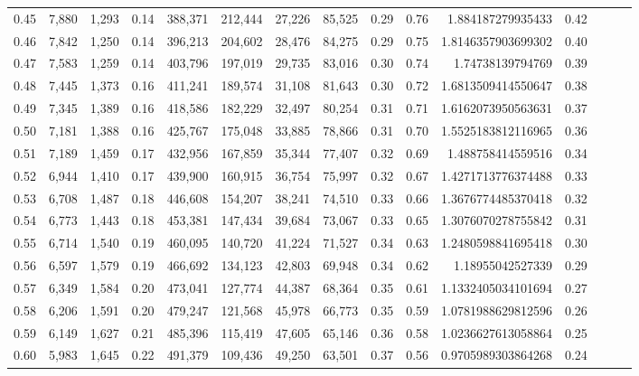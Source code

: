 \begin{tabular}{rrrrrrrrrrrrrrr}
0.45 &  7,880 &  1,293 &  0.14 &  388,371 &  212,444 &   27,226 &   85,525 &  0.29 &  0.76 &       1.884187279935433 &      0.42 \\
0.46 &  7,842 &  1,250 &  0.14 &  396,213 &  204,602 &   28,476 &   84,275 &  0.29 &  0.75 &      1.8146357903699302 &      0.40 \\
0.47 &  7,583 &  1,259 &  0.14 &  403,796 &  197,019 &   29,735 &   83,016 &  0.30 &  0.74 &        1.74738139794769 &      0.39 \\
0.48 &  7,445 &  1,373 &  0.16 &  411,241 &  189,574 &   31,108 &   81,643 &  0.30 &  0.72 &      1.6813509414550647 &      0.38 \\
0.49 &  7,345 &  1,389 &  0.16 &  418,586 &  182,229 &   32,497 &   80,254 &  0.31 &  0.71 &      1.6162073950563631 &      0.37 \\
0.50 &  7,181 &  1,388 &  0.16 &  425,767 &  175,048 &   33,885 &   78,866 &  0.31 &  0.70 &      1.5525183812116965 &      0.36 \\
0.51 &  7,189 &  1,459 &  0.17 &  432,956 &  167,859 &   35,344 &   77,407 &  0.32 &  0.69 &       1.488758414559516 &      0.34 \\
0.52 &  6,944 &  1,410 &  0.17 &  439,900 &  160,915 &   36,754 &   75,997 &  0.32 &  0.67 &      1.4271713776374488 &      0.33 \\
0.53 &  6,708 &  1,487 &  0.18 &  446,608 &  154,207 &   38,241 &   74,510 &  0.33 &  0.66 &      1.3676774485370418 &      0.32 \\
0.54 &  6,773 &  1,443 &  0.18 &  453,381 &  147,434 &   39,684 &   73,067 &  0.33 &  0.65 &      1.3076070278755842 &      0.31 \\
0.55 &  6,714 &  1,540 &  0.19 &  460,095 &  140,720 &   41,224 &   71,527 &  0.34 &  0.63 &      1.2480598841695418 &      0.30 \\
0.56 &  6,597 &  1,579 &  0.19 &  466,692 &  134,123 &   42,803 &   69,948 &  0.34 &  0.62 &        1.18955042527339 &      0.29 \\
0.57 &  6,349 &  1,584 &  0.20 &  473,041 &  127,774 &   44,387 &   68,364 &  0.35 &  0.61 &      1.1332405034101694 &      0.27 \\
0.58 &  6,206 &  1,591 &  0.20 &  479,247 &  121,568 &   45,978 &   66,773 &  0.35 &  0.59 &      1.0781988629812596 &      0.26 \\
0.59 &  6,149 &  1,627 &  0.21 &  485,396 &  115,419 &   47,605 &   65,146 &  0.36 &  0.58 &      1.0236627613058864 &      0.25 \\
0.60 &  5,983 &  1,645 &  0.22 &  491,379 &  109,436 &   49,250 &   63,501 &  0.37 &  0.56 &      0.9705989303864268 &      0.24 \\

\end{tabular}
